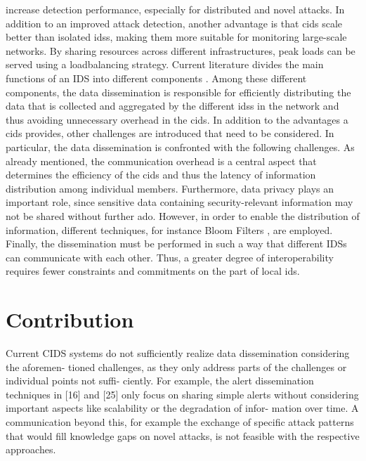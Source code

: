 \documentclass[../../main.tex]{subfiles}
\begin{document}
increase detection performance, especially for distributed and novel attacks. In addition to an improved attack detection, another advantage is that \gls{cids} scale better than isolated \glspl{ids}, making them more suitable for monitoring large-scale networks. By sharing resources across different infrastructures, peak loads can be served using a loadbalancing strategy. Current literature divides the main functions of an IDS into different components \cite{vasilomanolakis_collaborative_2016}. Among these different components, the data dissemination is responsible for efficiently distributing the data that is collected and aggregated by the different \glspl{ids} in the network and thus avoiding unnecessary overhead in the \gls{cids}. In addition to the advantages a \gls{cids} provides, other challenges are introduced that need to be considered. In particular, the data dissemination is confronted with the following challenges. As already mentioned, the communication overhead is a central aspect that determines the efficiency of the \gls{cids} and thus the latency of information distribution among individual members. Furthermore, data privacy plays an important role, since sensitive data containing security-relevant information may not be shared without further ado. However, in order to enable the distribution of information, different techniques, for instance Bloom Filters \cite{Vasilomanolakis2015SkipMon} \cite{Locasto2005}, are employed. Finally, the dissemination must be performed in such a way that different IDSs can communicate with each other. Thus, a greater degree of interoperability requires fewer constraints and commitments on the part of local \gls{ids}.

\section{Contribution} %

Current CIDS systems do not sufficiently realize data dissemination considering the aforemen-
tioned challenges, as they only address parts of the challenges or individual points not suffi-
ciently. For example, the alert dissemination techniques in [16] and [25] only focus on sharing
simple alerts without considering important aspects like scalability or the degradation of infor-
mation over time. A communication beyond this, for example the exchange of specific attack
patterns that would fill knowledge gaps on novel attacks, is not feasible with the respective
approaches.
\end{document}
